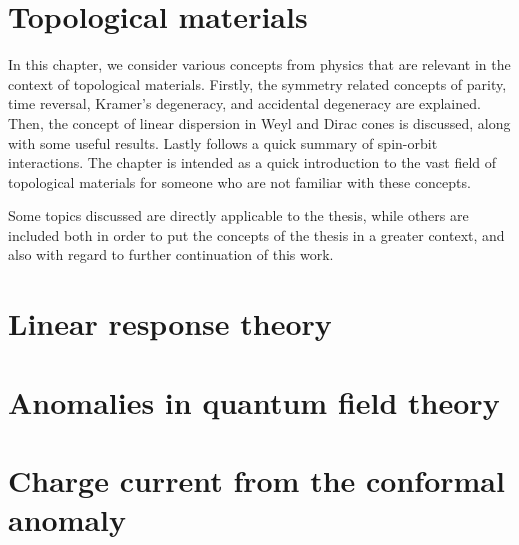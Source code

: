 \documentclass[
draft,
fontsize=11pt,
paper=B5,
BCOR=5mm,
]{scrbook}
\begin{document}
% 
\frontmatter
{}


\tableofcontents

\mainmatter
{}


\chapter{Topological materials}
In this chapter, we consider various concepts from physics that are relevant in the context of topological materials.
Firstly, the symmetry related concepts of parity, time reversal, Kramer's degeneracy, and accidental degeneracy are explained.
Then, the concept of linear dispersion in Weyl and Dirac cones is discussed, along with some useful results.
Lastly follows a quick summary of spin-orbit interactions.
The chapter is intended as a quick introduction to the vast field of topological materials for someone who are not familiar with these concepts.

Some topics discussed are directly applicable to the thesis, while others are included both in order to put the concepts of the thesis in a greater context, and also with regard to further continuation of this work.









\chapter{Linear response theory}


\chapter{Anomalies in quantum field theory}


\chapter{Charge current from the conformal anomaly}\label{ch:charge-current}





\end{document}
